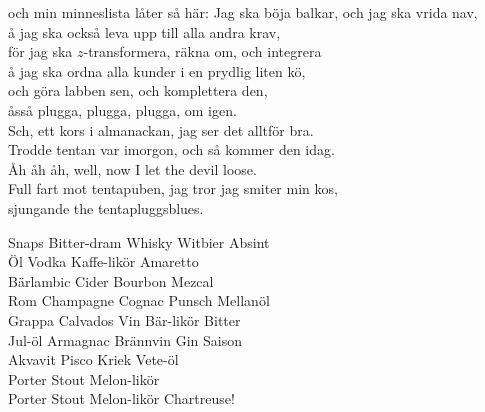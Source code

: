 \documentclass[a6paper, 10pt, twoside]{article}
\begin{document}
\begin{lyrics}
och min minneslista låter så här:
\newpage
\noindent
Jag ska böja balkar, och jag ska vrida nav, \\
å jag ska också leva upp till alla andra krav, \\
för jag ska $z$-transformera, räkna om, och integrera \\
å jag ska ordna alla kunder i en prydlig liten kö, \\
och göra labben sen, och komplettera den, \\
åsså plugga, plugga, plugga, om igen.
\vspace{5pt} \\
Sch, ett kors i almanackan, jag ser det alltför bra. \\
Trodde tentan var imorgon, och så kommer den idag. \\
Åh åh åh, well, now I let the devil loose. \\
Full fart mot tentapuben, jag tror jag smiter min kos, \\
sjungande the tentapluggsblues. 
\end{lyrics}

\begin{center}
\end{center}
\begin{lyrics}
Snaps Bitter-dram Whisky Witbier Absint \\
Öl Vodka Kaffe-likör Amaretto \\
Bärlambic Cider Bourbon Mezcal \\
Rom Champagne Cognac Punsch Mellanöl
\vspace{5pt} \\
Grappa Calvados   Vin Bär-likör Bitter \\
Jul-öl Armagnac   Brännvin Gin Saison \\
Akvavit Pisco Kriek Vete-öl
\vspace{5pt} \\
Porter Stout Melon-likör   \\
Porter Stout Melon-likör Chartreuse!
\end{lyrics}
\end{document}
